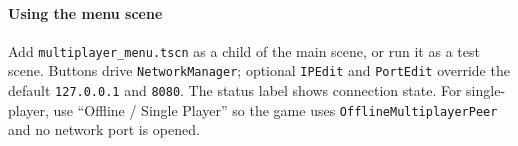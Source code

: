 \documentclass{article}
\begin{document}
\paragraph*{Using the menu scene}
Add \texttt{multiplayer\_menu.tscn} as a child of the main scene, or run
it as a test scene. Buttons drive \texttt{NetworkManager}; optional
\texttt{IPEdit} and \texttt{PortEdit} override the default
\texttt{127.0.0.1} and \texttt{8080}. The status label shows connection
state. For single-player, use ``Offline / Single Player'' so the game
uses \texttt{OfflineMultiplayerPeer} and no network port is opened.
\end{document}
